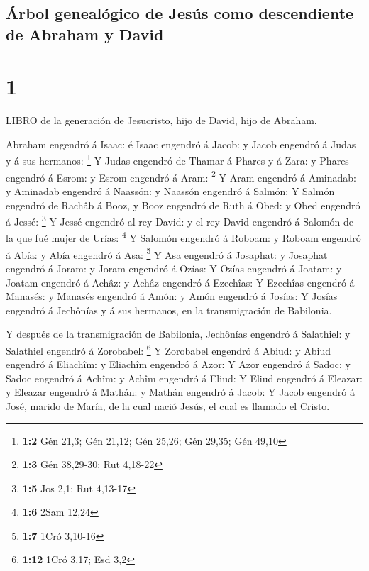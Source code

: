 \hypertarget{uxe1rbol-genealuxf3gico-de-jesuxfas-como-descendiente-de-abraham-y-david}{%
\subsection{Árbol genealógico de Jesús como descendiente de Abraham y
David}\label{uxe1rbol-genealuxf3gico-de-jesuxfas-como-descendiente-de-abraham-y-david}}

\hypertarget{section}{%
\section{1}\label{section}}

 LIBRO de la generación de Jesucristo, hijo de David, hijo
de Abraham.

 Abraham engendró á Isaac: é Isaac engendró á Jacob: y Jacob
engendró á Judas y á sus hermanos: \footnote{\textbf{1:2} Gén 21,3; Gén
  21,12; Gén 25,26; Gén 29,35; Gén 49,10}  Y Judas engendró
de Thamar á Phares y á Zara: y Phares engendró á Esrom: y Esrom engendró
á Aram: \footnote{\textbf{1:3} Gén 38,29-30; Rut 4,18-22}  Y
Aram engendró á Aminadab: y Aminadab engendró á Naassón: y Naassón
engendró á Salmón:  Y Salmón engendró de Rachâb á Booz, y
Booz engendró de Ruth á Obed: y Obed engendró á Jessé: \footnote{\textbf{1:5}
  Jos 2,1; Rut 4,13-17}  Y Jessé engendró al rey David: y el
rey David engendró á Salomón de la que fué mujer de Urías: \footnote{\textbf{1:6}
  2Sam 12,24}  Y Salomón engendró á Roboam: y Roboam
engendró á Abía: y Abía engendró á Asa: \footnote{\textbf{1:7} 1Cró
  3,10-16}  Y Asa engendró á Josaphat: y Josaphat engendró á
Joram: y Joram engendró á Ozías:  Y Ozías engendró á Joatam:
y Joatam engendró á Achâz: y Achâz engendró á Ezechîas:  Y
Ezechîas engendró á Manasés: y Manasés engendró á Amón: y Amón engendró
á Josías:  Y Josías engendró á Jechônías y á sus hermanos,
en la transmigración de Babilonia.

 Y después de la transmigración de Babilonia, Jechônías
engendró á Salathiel: y Salathiel engendró á Zorobabel: \footnote{\textbf{1:12}
  1Cró 3,17; Esd 3,2}  Y Zorobabel engendró á Abiud: y
Abiud engendró á Eliachîm: y Eliachîm engendró á Azor:  Y
Azor engendró á Sadoc: y Sadoc engendró á Achîm: y Achîm engendró á
Eliud:  Y Eliud engendró á Eleazar: y Eleazar engendró á
Mathán: y Mathán engendró á Jacob:  Y Jacob engendró á
José, marido de María, de la cual nació Jesús, el cual es llamado el
Cristo.

